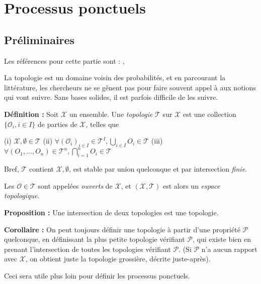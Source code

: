 \documentclass[12pt]{article}
\begin{document}
\section{Processus ponctuels}

\subsection{Préliminaires}

Les références pour cette partie sont : \cite{TopologieGénéraleEspaceNormésHassan2021}, \cite{PPBeyond2023}

La topologie est un domaine voisin des probabilités, et en parcourant la littérature, les chercheurs ne se gênent pas pour faire souvent appel à aux notions qui vont suivre. Sans bases solides, il est parfois difficile de les suivre. 

\textbf{Définition :} Soit $\mathcal X$ un ensemble. Une \textit{topologie} $\mathcal T$ sur $\mathcal X$ est une collection $ \{ \mathcal O_i, i\in I \} $ de parties de $\mathcal X$, telles que 

(i) $\mathcal X, \emptyset \in \mathcal T$ \qquad (ii) $ \displaystyle \forall (\mathcal O_i)_{i\in I} \in \mathcal T^I, \bigcup_{i\in I} O_i \in \mathcal T$ \qquad (iii) $ \displaystyle \forall (O_1, ..., O_n) \in \mathcal T^n, \bigcap_{i=1}^n O_i \in \mathcal T $

Bref, $\mathcal T$ contient $\mathcal X, \emptyset$, est stable par union quelconque et par intersection \textit{finie}.

Les $\mathcal O \in \mathcal T$ sont appelées \textit{ouverts} de $\mathcal X$, et $(\mathcal X, \mathcal T)$ est alors un \textit{espace topologique}.

\textbf{Proposition :} Une intersection de deux topologies est une topologie. 

\textbf{Corollaire :} On peut toujours définir une topologie à partir d'une propriété $\mathcal P$ quelconque, en définissant la plus petite topologie vérifiant $\mathcal P$, qui existe bien en prenant l'intersection de toutes les topologies vérifiant $\mathcal P$. (Si $\mathcal P$ n'a aucun rapport avec $\mathcal X$, on obtient juste la topologie grossière, décrite juste-après). 

Ceci sera utile plus loin pour définir les processus ponctuels.
\end{document}
